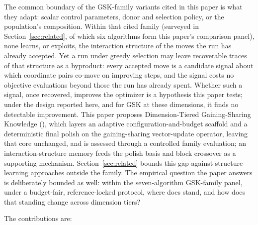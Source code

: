 The common boundary of the GSK-family variants cited in this paper is what
they adapt: scalar control parameters, donor and selection policy, or the
population's composition. Within that cited family (surveyed in
Section~\ref{sec:related}, of which six algorithms form this paper's
comparison panel), none learns, or exploits,
the interaction structure of the moves the run has already
accepted. %
Yet a run under greedy selection may leave recoverable traces of that
structure as a byproduct: every accepted move is a candidate signal about
which coordinate pairs co-move on improving steps, and the signal costs no
objective evaluations beyond those the run has already spent. Whether such
a signal, once recovered, improves the optimizer is a hypothesis this paper
tests; under the design reported here, and for GSK at these dimensions, it
finds no detectable improvement. This paper proposes
Dimension-Tiered Gaining-Sharing Knowledge (\dtgsk{}),
which layers an adaptive configuration-and-budget scaffold and a deterministic final polish on the gaining-sharing vector-update operator, leaving that core unchanged, and is assessed through a controlled family evaluation; an interaction-structure memory feeds the polish basis and block crossover as a supporting mechanism. %
Section~\ref{sec:related} bounds this gap against structure-learning
approaches outside the family. The empirical question the paper answers
is deliberately bounded as well: within the seven-algorithm GSK-family
panel, under a budget-fair, reference-locked protocol, where does
\dtgsk{} stand, and how does that standing change across dimension
tiers?

The contributions are:


